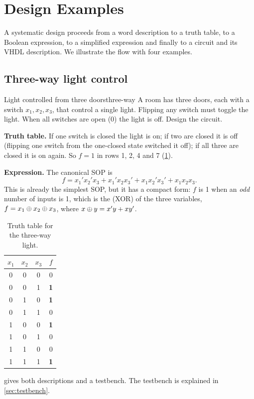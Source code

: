 \section{Design Examples}\label{sec:examples2}
A systematic design proceeds from a word description to a truth table, to a Boolean expression, to a simplified expression and finally to a circuit and its VHDL description. We illustrate the flow with four examples.

\subsection{Three-way light control}
\begin{example}{Light controlled from three doors}{three-way}
A room has three doors, each with a switch $x_1,x_2,x_3$, that control a single light. Flipping any switch must toggle the light. When all switches are open (0) the light is off. Design the circuit.

\textbf{Truth table.} If one switch is closed the light is on; if two are closed it is off (flipping one switch from the one-closed state switched it off); if all three are closed it is on again. So $f=1$ in rows 1, 2, 4 and 7 (\cref{tab:threeway}).

\textbf{Expression.} The canonical SOP is
\[
 f = x_1'x_2'x_3 + x_1'x_2x_3' + x_1x_2'x_3' + x_1x_2x_3 .
\]
This is already the simplest SOP, but it has a compact form: $f$ is 1 when an \emph{odd} number of inputs is 1, which is the  (XOR) of the three variables, $f = x_1\oplus x_2\oplus x_3$, where $x\oplus y = x'y+xy'$.
\end{example}

\begin{table}[htbp]
\centering
\caption{Truth table for the three-way light.}
\label{tab:threeway}
\begin{tabular}{ccc|c}
\toprule
$x_1$&$x_2$&$x_3$&$f$\\ \midrule
0&0&0&0\\0&0&1&\textbf{1}\\0&1&0&\textbf{1}\\0&1&1&0\\
1&0&0&\textbf{1}\\1&0&1&0\\1&1&0&0\\1&1&1&\textbf{1}\\ \bottomrule
\end{tabular}
\end{table}

 gives both descriptions and a testbench. The testbench is explained in \cref{sec:testbench}.

